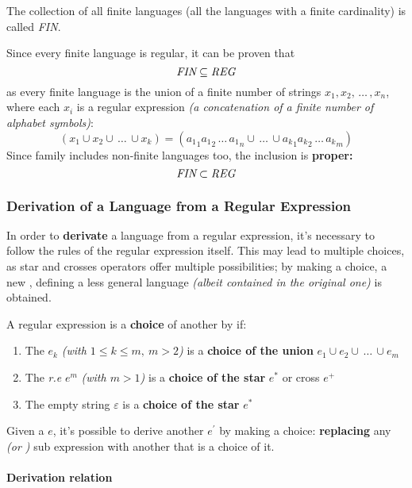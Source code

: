 \documentclass[english]{article}
\begin{document}
\begin{definition}
  The collection of all finite languages (all the languages with a finite cardinality) is called \textit{FIN}.
\end{definition}

Since every finite language is regular, it can be proven that
\[ \textit{FIN} \subseteq \textit{REG} \]
as every finite language is the union of a finite number of strings \(x_1, x_2,\,\ldots\,, x_n\), where each \(x_i\) is a regular expression \textit{(a concatenation of a finite number of alphabet symbols)}:
\[ \left(x_1 \cup x_2 \cup \,\ldots\, \cup x_k \right) = \left({a_1}_1 {a_1}_2 \,\ldots\, {a_1}_n \cup \,\ldots\, \cup {a_k}_1 {a_k}_2 \,\ldots\, {a_k}_m \right) \]
Since family \REG includes non-finite languages too, the inclusion is \textbf{proper:}
\[ \textit{FIN} \subset \textit{REG} \]

\subsubsection{Derivation of a Language from a Regular Expression}

In order to \textbf{derivate} a language from a regular expression, it's necessary to follow the rules of the regular expression itself.
This may lead to multiple choices, as star and crosses operators offer multiple possibilities;
by making a choice, a new \re, defining a less general language \textit{(albeit contained in the original one)} is obtained.

A regular expression is a \textbf{choice} of another by if:

\begin{enumerate}
  \item The \re \(e_k\) \textit{(with \(1 \leq k \leq m, \ m > 2\))} is a \textbf{choice of the union} \(e_1 \cup e_2 \cup \,\ldots\, \cup e_m\)
  \item The \textit{r.e} \(e^m\) \textit{(with \(m > 1\))} is a \textbf{choice of the star} \(e^\ast\) or cross \(e^+\)
  \item The empty string \(\varepsilon\) is a \textbf{choice of the star} \(e^\ast\)
\end{enumerate}

Given a \re \(e\), it's possible to derive another \re \(e^\prime\) by making a choice:
\textbf{replacing} any  \textit{(or )} sub expression with another that is a choice of it.

\paragraph{Derivation relation}
\end{document}
